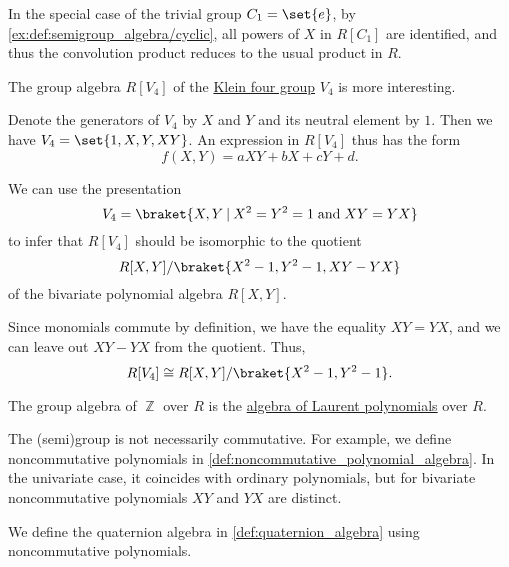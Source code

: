\begin{example}
\begin{thmenum}
     In the special case of the trivial group \( C_1 = \set{ e } \), by \cref{ex:def:semigroup_algebra/cyclic}, all powers of \( X \) in \( R[C_1] \) are identified, and thus the convolution product reduces to the usual product in \( R \).

     The group algebra \( R[V_4] \) of the \hyperref[def:klein_four_group]{Klein four group} \( V_4 \) is more interesting.

    Denote the generators of \( V_4 \) by \( X \) and \( Y \) and its neutral element by \( 1 \). Then we have \( V_4 = \set{ 1, X, Y, XY } \). An expression in \( R[V_4] \) thus has the form
    \begin{equation*}
      f(X, Y) = aXY + bX + cY + d.
    \end{equation*}

    We can use the presentation
    \begin{equation*}
      V_4 = \braket{ X, Y \given X^2 = Y^2 = 1 \T{and} XY = YX }
    \end{equation*}
    to infer that \( R[V_4] \) should be isomorphic to the quotient
    \begin{equation*}
      R[X, Y] / \braket{ X^2 - 1, Y^2 - 1, XY - YX }
    \end{equation*}
    of the bivariate polynomial algebra \( R[X, Y] \).

    Since monomials commute by definition, we have the equality \( XY = YX \), and we can leave out \( XY - YX \) from the quotient. Thus,
    \begin{equation*}
      R[V_4] \cong R[X, Y] / \braket{ X^2 - 1, Y^2 - 1 }.
    \end{equation*}

     The group algebra of \( \BbbZ \) over \( R \) is the \hyperref[def:laurent_polynomial_algebra]{algebra of Laurent polynomials} over \( R \).

     The (semi)group is not necessarily commutative. For example, we define noncommutative polynomials in \cref{def:noncommutative_polynomial_algebra}. In the univariate case, it coincides with ordinary polynomials, but for bivariate noncommutative polynomials \( XY \) and \( YX \) are distinct.

    We define the quaternion algebra in \cref{def:quaternion_algebra} using noncommutative polynomials.
  \end{thmenum}
\end{example}

